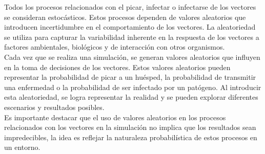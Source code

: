 Todos los procesos relacionados con el picar, infectar o infectarse de los vectores se consideran estocásticos. 
Estos procesos dependen de valores aleatorios que introducen incertidumbre en el 
comportamiento de los vectores. La aleatoriedad se utiliza para capturar la variabilidad inherente en 
la respuesta de los vectores a factores ambientales, biológicos y de interacción con otros organismos.\\

Cada vez que se realiza una simulación, se generan valores aleatorios que influyen en la toma de decisiones de 
los vectores. Estos valores aleatorios pueden representar la probabilidad de picar a un huésped, la 
probabilidad de transmitir una enfermedad o la probabilidad de ser infectado por un patógeno. Al introducir 
esta aleatoriedad, se logra representar la realidad y se pueden explorar diferentes escenarios 
y resultados posibles.\\

Es importante destacar que el uso de valores aleatorios en los procesos relacionados con los vectores en la 
simulación no implica que los resultados sean impredecibles, la idea es reflejar la 
naturaleza probabilística de estos procesos en un entorno.






